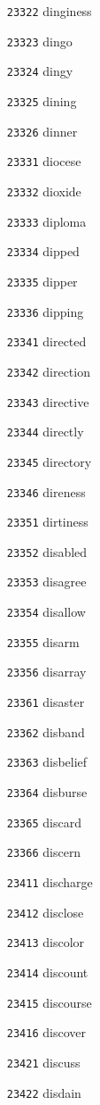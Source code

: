 \documentclass[twoside,11pt]{article}
\begin{document}
\begin{multicols}{5}
\begin{enumerate}
\item[\texttt{23322}] dinginess
\item[\texttt{23323}] dingo
\item[\texttt{23324}] dingy
\item[\texttt{23325}] dining
\item[\texttt{23326}] dinner
\item[\texttt{23331}] diocese
\item[\texttt{23332}] dioxide
\item[\texttt{23333}] diploma
\item[\texttt{23334}] dipped
\item[\texttt{23335}] dipper
\item[\texttt{23336}] dipping
\item[\texttt{23341}] directed
\item[\texttt{23342}] direction
\item[\texttt{23343}] directive
\item[\texttt{23344}] directly
\item[\texttt{23345}] directory
\item[\texttt{23346}] direness
\item[\texttt{23351}] dirtiness
\item[\texttt{23352}] disabled
\item[\texttt{23353}] disagree
\item[\texttt{23354}] disallow
\item[\texttt{23355}] disarm
\item[\texttt{23356}] disarray
\item[\texttt{23361}] disaster
\item[\texttt{23362}] disband
\item[\texttt{23363}] disbelief
\item[\texttt{23364}] disburse
\item[\texttt{23365}] discard
\item[\texttt{23366}] discern
\item[\texttt{23411}] discharge
\item[\texttt{23412}] disclose
\item[\texttt{23413}] discolor
\item[\texttt{23414}] discount
\item[\texttt{23415}] discourse
\item[\texttt{23416}] discover
\item[\texttt{23421}] discuss
\item[\texttt{23422}] disdain

\end{enumerate}
\end{multicols}
\end{document}
